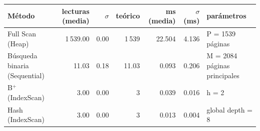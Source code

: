 \begin{tabular}{@{}lrrrrrl@{}}
\toprule
Método & lecturas (media) & $\sigma$ & teórico & ms (media) & $\sigma$ (ms) & parámetros \\
\midrule
Full Scan (Heap) & 1\,539.00 & 0.00 & 1\,539 & 22.504 & 4.136 & P = 1539 páginas \\
Búsqueda binaria (Sequential) & 11.03 & 0.18 & 11.03 & 0.093 & 0.206 & M = 2084 páginas principales \\
B$^+$ (IndexScan) & 3.00 & 0.00 & 3 & 0.039 & 0.016 & h = 2 \\
Hash (IndexScan) & 3.00 & 0.00 & 3 & 0.013 & 0.004 & global depth = 8 \\
\bottomrule
\end{tabular}
